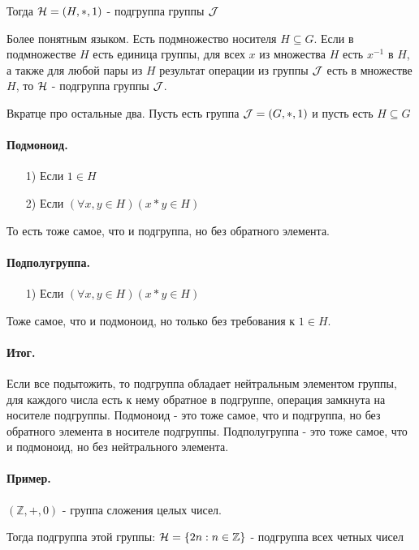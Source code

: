 \documentclass{report}
\begin{document}
Тогда ${\cal H} = (H, *, 1)$ - подгруппа группы $\cal J$


Более понятным языком. Есть подмножество носителя $H \subseteq G$. Если в подмножестве
$H$ есть единица группы, для всех $x$ из множества $H$ есть $x^{-1}$ в $H$, а также
для любой пары из $H$ результат операции из группы $\cal J$ есть в множестве $H$, то
${\cal H}$ - подгруппа группы $\cal J$.

\medskip

Вкратце про остальные два. Пусть есть группа ${\cal J} = (G, *, 1)$ и пусть есть $H \subseteq G$

\paragraph*{Подмоноид.}
\begin{itemize}
	\item[1)] Если $1 \in H$
	\item[2)] Если $(\forall x,y \in H)(x * y \in H)$
\end{itemize}

То есть тоже самое, что и подгруппа, но без обратного элемента.

\paragraph*{Подполугруппа.}
\begin{itemize}
	\item[1)] Если $(\forall x,y \in H)(x * y \in H)$
\end{itemize}

Тоже самое, что и подмоноид, но только без требования к $1 \in H$.

\paragraph*{Итог.}
Если все подытожить, то подгруппа обладает нейтральным элементом группы,
для каждого числа есть к нему обратное в подгруппе, операция замкнута на носителе
подгруппы. Подмоноид - это тоже самое, что и подгруппа,
но без обратного элемента в носителе подгруппы.
Подполугруппа - это тоже самое, что и подмоноид, но без нейтрального элемента.

\paragraph*{Пример.}
$(\mathbb{Z}, +, 0)$ - группа сложения целых чисел.

Тогда подгруппа этой группы: ${\cal H} = \{2n:n \in \mathbb{Z}\}$ - подгруппа всех четных чисел
\end{document}
